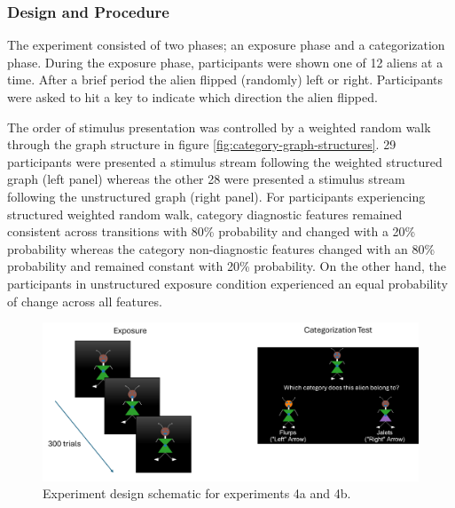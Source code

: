         
\subsubsection*{Design and Procedure}

The experiment consisted of two phases; an exposure phase and a categorization phase. During the exposure phase, participants were shown one of 12 aliens at a time. After a brief period the alien flipped (randomly) left or right. Participants were asked to hit a key to indicate which direction the alien flipped. 

The order of stimulus presentation was controlled by a weighted random walk through the graph structure in figure \ref{fig:category-graph-structures}. 29 participants were presented a stimulus stream following the weighted structured graph (left panel) whereas the other 28 were presented a stimulus stream following the unstructured graph (right panel). For participants experiencing structured weighted random walk, category diagnostic features remained consistent across transitions with 80\% probability and changed with a 20\% probability whereas the category non-diagnostic features changed with an 80\% probability and remained constant with 20\% probability. On the other hand, the participants in unstructured exposure condition experienced an equal probability of change across all features. 

\begin{figure}
    \centering
    \includegraphics[width = \textwidth]{chapter_notebooks/chapter_4/figures/exp45_design.png}
    \caption{Experiment design schematic for experiments 4a and 4b.}
    \label{fig:exp45-deisgn}
\end{figure}

